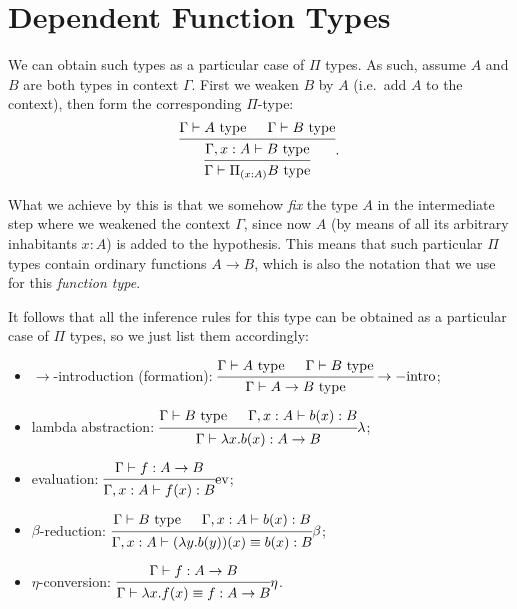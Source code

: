 \section{Dependent Function Types}

We can obtain such types as a particular case of $ \Pi $ types.
As such, assume $ A $ and $ B $ are both types in context $ \Gamma $.
First we weaken $ B $ by $ A $ (i.e.\ add $ A $ to the context), then
form the corresponding $ \Pi $-type:
\[
  \begin{prooftree}
    \hypo{\Gamma \vdash A \text{ type}}
    \hypo{\Gamma \vdash B \text{ type}}
    \infer2{\Gamma, x : A \vdash B \text{ type}}
    \infer1{\Gamma \vdash \Pi_{(x : A)} B \text{ type}}
  \end{prooftree}.
\]

What we achieve by this is that we somehow \emph{fix} the type $ A $
in the intermediate step where we weakened the context $ \Gamma $,
since now $ A $ (by means of all its arbitrary inhabitants $ x : A $)
is added to the hypothesis. This means that such particular $ \Pi $
types contain ordinary functions $ A \to B $, which is also the
notation that we use for this \emph{function type}.

It follows that all the inference rules for this type can be obtained
as a particular case of $ \Pi $ types, so we just list them accordingly:
\begin{itemize}
\item $ \to $-introduction (formation):
$ \begin{prooftree}
  \hypo{\Gamma \vdash A \text{ type}}
  \hypo{\Gamma \vdash B \text{ type}}
  \infer2{\Gamma \vdash A \to B \text{ type}}
\end{prooftree}\to-\text{intro}
$;
\item lambda abstraction:
$ \begin{prooftree}
  \hypo{\Gamma \vdash B \text{ type}}
  \hypo{\Gamma, x : A \vdash b(x) : B}
  \infer2{\Gamma \vdash \lambda x . b(x) : A \to B}
\end{prooftree}\lambda
$;
\item evaluation:
$ \begin{prooftree}
  \hypo{\Gamma \vdash f : A \to B}
  \infer1{\Gamma, x : A \vdash f(x) :B}
\end{prooftree}\text{ev}
$;
\item $ \beta $-reduction:
$ \begin{prooftree}
  \hypo{\Gamma \vdash B \text{ type}}
  \hypo{\Gamma, x : A \vdash b(x) : B}
  \infer2{\Gamma, x : A \vdash (\lambda y . b(y))(x) \equiv b(x) : B}
\end{prooftree}\beta
$;
\item $ \eta $-conversion:
$ \begin{prooftree}
  \hypo{\Gamma \vdash f : A \to B}
  \infer1{\Gamma \vdash \lambda x . f(x) \equiv f : A \to B}
\end{prooftree}\eta
$.
\end{itemize}

